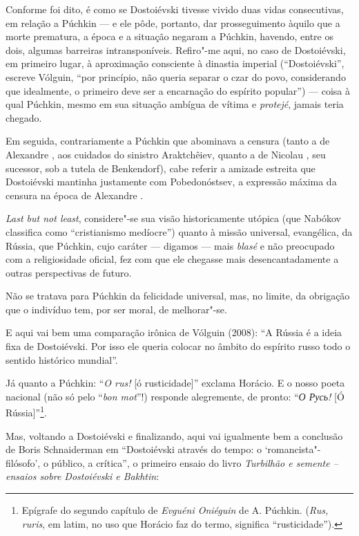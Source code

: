 Conforme foi dito, é como se Dostoiévski tivesse vivido duas vidas
consecutivas, em relação a Púchkin --- e ele pôde, portanto, dar
prosseguimento àquilo que a morte prematura, a época e a situação
negaram a Púchkin, havendo, entre os dois, algumas barreiras intransponíveis. Refiro"-me aqui, no caso
de Dostoiévski, em primeiro lugar, à aproximação consciente à dinastia
imperial (``Dostoiévski'', escreve Vólguin, ``por princípio, não
queria separar o czar do povo, considerando que idealmente, o primeiro
deve ser a encarnação do espírito popular'') --- coisa à qual Púchkin,
mesmo em sua situação ambígua de vítima e \emph{protejé}, jamais teria
chegado.

Em seguida, contrariamente a Púchkin que abominava a censura (tanto a
de Alexandre , aos cuidados do sinistro Araktchêiev, quanto a de Nicolau 
, seu sucessor, sob a tutela de Benkendorf), cabe referir a amizade
estreita que Dostoiévski mantinha justamente com Pobedonóstsev, a
expressão máxima da censura na época de Alexandre .

\emph{Last but not least}, considere"-se sua visão historicamente utópica
(que Nabókov classifica como ``cristianismo medíocre'') quanto à
missão universal, evangélica, da Rússia, que Púchkin, cujo caráter --- digamos --- mais \emph{blasé} e não preocupado com a religiosidade
oficial, fez com que ele chegasse mais desencantadamente a outras
perspectivas de futuro.

Não se tratava para Púchkin da felicidade universal, mas, no limite, da
obrigação que o indivíduo tem, por ser moral, de melhorar"-se.

E aqui vai bem uma comparação irônica de Vólguin (2008): ``A
Rússia é a ideia fixa de Dostoiévski. Por isso ele queria colocar no
âmbito do espírito russo todo o sentido histórico mundial''.

Já quanto a Púchkin: ``\emph{O rus!} [ó rusticidade]'' exclama Horácio. E o nosso poeta
nacional (não só pelo ``\emph{bon mot}''!) responde alegremente, de pronto: ``\emph{О
Русь!} [Ó Rússia]''\footnote{Epígrafe do segundo capítulo de
\emph{Evguéni Oniéguin} de A. Púchkin. (\emph{Rus, ruris}, em latim, no
uso que Horácio faz do termo, significa ``rusticidade'').}.

Mas, voltando a Dostoiévski e finalizando, aqui vai igualmente bem a
conclusão de Boris Schnaiderman em ``Dostoiévski através do tempo:
o `romancista"-filósofo', o público, a crítica'', o primeiro ensaio
do livro \emph{Turbilhão e semente -- ensaios sobre Dostoiévski e
Bakhtin}:

